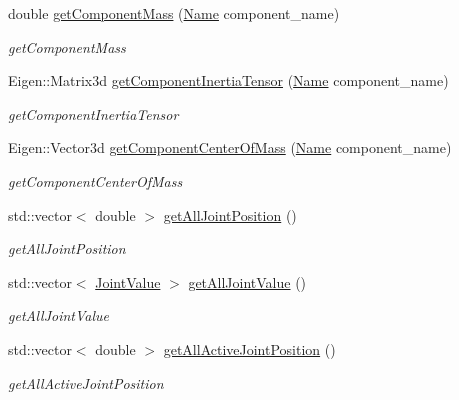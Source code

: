 \begin{DoxyCompactItemize}
double \hyperlink{classrobotis__manipulator_1_1_manipulator_a3af8d42e8d3ef45ccbbfc7b052c51e07}{get\+Component\+Mass} (\hyperlink{namespacerobotis__manipulator_a08c2d25e77a01ad75b9bb740f8ce4765}{Name} component\+\_\+name)
\begin{DoxyCompactList}\small\item\em get\+Component\+Mass \end{DoxyCompactList}\item 
Eigen\+::\+Matrix3d \hyperlink{classrobotis__manipulator_1_1_manipulator_a05d58cf6a4e7540d00a8621f9ba83f07}{get\+Component\+Inertia\+Tensor} (\hyperlink{namespacerobotis__manipulator_a08c2d25e77a01ad75b9bb740f8ce4765}{Name} component\+\_\+name)
\begin{DoxyCompactList}\small\item\em get\+Component\+Inertia\+Tensor \end{DoxyCompactList}\item 
Eigen\+::\+Vector3d \hyperlink{classrobotis__manipulator_1_1_manipulator_a7002f6083a3f72754189c60d9e92241a}{get\+Component\+Center\+Of\+Mass} (\hyperlink{namespacerobotis__manipulator_a08c2d25e77a01ad75b9bb740f8ce4765}{Name} component\+\_\+name)
\begin{DoxyCompactList}\small\item\em get\+Component\+Center\+Of\+Mass \end{DoxyCompactList}\item 
std\+::vector$<$ double $>$ \hyperlink{classrobotis__manipulator_1_1_manipulator_a32a7e8ec9292d714fe824982f2f21c83}{get\+All\+Joint\+Position} ()
\begin{DoxyCompactList}\small\item\em get\+All\+Joint\+Position \end{DoxyCompactList}\item 
std\+::vector$<$ \hyperlink{namespacerobotis__manipulator_aa0556c98c5294ccf3a96c2d0fe315e40}{Joint\+Value} $>$ \hyperlink{classrobotis__manipulator_1_1_manipulator_a2d1613d98d3f2bfcddf78df3871ef974}{get\+All\+Joint\+Value} ()
\begin{DoxyCompactList}\small\item\em get\+All\+Joint\+Value \end{DoxyCompactList}\item 
std\+::vector$<$ double $>$ \hyperlink{classrobotis__manipulator_1_1_manipulator_a5910fd02cefde8b34e7db6af4ab8415d}{get\+All\+Active\+Joint\+Position} ()
\begin{DoxyCompactList}\small\item\em get\+All\+Active\+Joint\+Position \end{DoxyCompactList}\item 

\end{DoxyCompactItemize}
